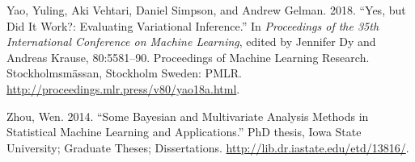 \documentclass[]{article}
\theoremstyle{definition}
\begin{document}
\leavevmode\hypertarget{ref-pmlr-v80-yao18a}{}%
Yao, Yuling, Aki Vehtari, Daniel Simpson, and Andrew Gelman. 2018.
``Yes, but Did It Work?: Evaluating Variational Inference.'' In
\emph{Proceedings of the 35th International Conference on Machine
Learning}, edited by Jennifer Dy and Andreas Krause, 80:5581--90.
Proceedings of Machine Learning Research. Stockholmsmässan, Stockholm
Sweden: PMLR. \url{http://proceedings.mlr.press/v80/yao18a.html}.

\leavevmode\hypertarget{ref-zhou2014some}{}%
Zhou, Wen. 2014. ``Some Bayesian and Multivariate Analysis Methods in
Statistical Machine Learning and Applications.'' PhD thesis, Iowa State
University; Graduate Theses; Dissertations.
\url{http://lib.dr.iastate.edu/etd/13816/}.
\end{document}
